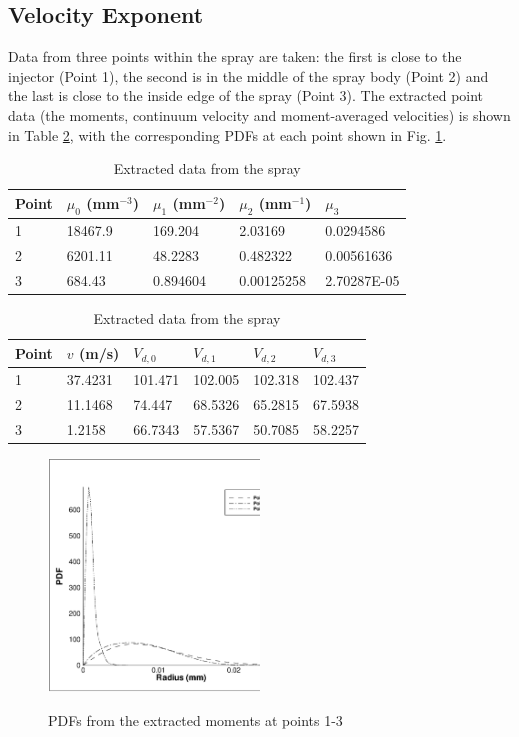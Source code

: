 \documentclass[a4paper,10pt]{article}
\begin{document}
\subsection{Velocity Exponent} %
Data from three points within the spray are taken: the first is close to the injector (Point 1), the second is in the middle of the spray body (Point 2) and the last is close to the inside edge of the spray (Point 3). The extracted point data (the moments, continuum velocity and moment-averaged velocities) is shown in Table \ref{tab:point_data}, with the corresponding PDFs at each point shown in Fig. \ref{fig:d_pdf}.
%
\begin{table}[H]
\caption{Extracted data from the spray}
\vspace{2mm}
\centering
\begin{tabular}{| l | llll |}
\hline \hline
Point & $\mu_0$ (mm$^{-3}$) & $\mu_1$ (mm$^{-2}$) & $\mu_2$ (mm$^{-1}$) & $\mu_3$ \\
\hline
1 & 18467.9 & 169.204 & 2.03169 & 0.0294586 \\
2 & 6201.11 & 48.2283 & 0.482322 & 0.00561636 \\
3 & 684.43 & 0.894604 & 0.00125258 & 2.70287E-05 \\
\hline
\end{tabular}
\vspace{2mm}
\begin{tabular}{| l || l | llll |}
\hline \hline
Point & $v$ (m/s) & $V_{d,0}$ & $V_{d,1}$ & $V_{d,2}$ & $V_{d,3}$ \\
\hline
1 & 37.4231 & 101.471 & 102.005 & 102.318 & 102.437 \\
2 & 11.1468 & 74.447 & 68.5326 & 65.2815 & 67.5938 \\
3 & 1.2158 & 66.7343 & 57.5367 & 50.7085 & 58.2257 \\
\hline
\end{tabular}
\label{tab:point_data}
\end{table}
%
\begin{figure}[H]
\centering
\includegraphics[width=0.5\textwidth]{d_pdf.eps}
\label{fig:d_pdf}
\caption{PDFs from the extracted moments at points 1-3}
\end{figure}
\end{document}
